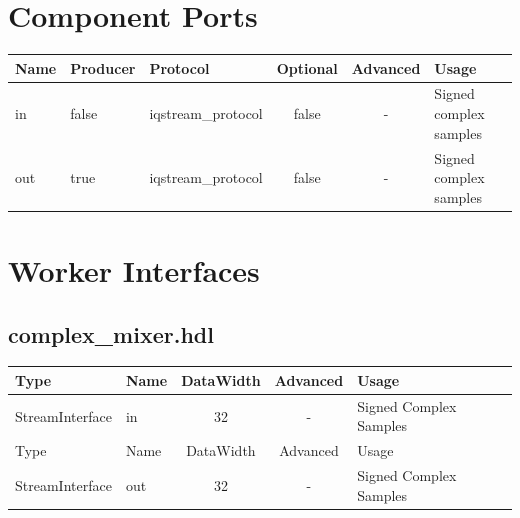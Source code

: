 \documentclass{article}
\def\comp{complex\_mixer}
\begin{document}
\begin{landscape}
	\section*{Component Ports}
	\begin{scriptsize}
		\begin{tabular}{|M{2cm}|M{1.5cm}|M{4cm}|c|c|M{9cm}|}
			\hline
			Name & Producer & Protocol           & Optional & Advanced & Usage                  \\
			\hline
			in   & false    & iqstream\_protocol & false    & -        & Signed complex samples \\
			\hline
			out  & true     & iqstream\_protocol & false    & -        & Signed complex samples \\
			\hline
		\end{tabular}
	\end{scriptsize}

	\section*{Worker Interfaces}
	\subsection*{\comp.hdl}
	\begin{scriptsize}
		\begin{tabular}{|M{2cm}|M{1.5cm}|c|c|M{12cm}|}
			\hline
			\rowcolor{blue}
			Type            & Name & DataWidth & Advanced                & Usage                  \\
			\hline
			StreamInterface & in   & 32        & - & Signed Complex Samples \\
			\hline
			\rowcolor{blue}
			Type            & Name & DataWidth & Advanced                & Usage                  \\
			\hline
			StreamInterface & out  & 32        & - & Signed Complex Samples \\
			\hline
		\end{tabular}
	\end{scriptsize}
\end{landscape}
\end{document}
